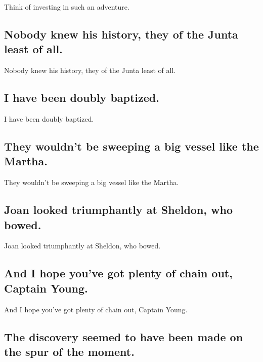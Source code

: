 \documentclass[]{article}
\begin{document}
Think of investing in such an adventure.

\hypertarget{nobody-knew-his-history-they-of-the-junta-least-of-all.}{%
\subsection{Nobody knew his history, they of the Junta least of
all.}\label{nobody-knew-his-history-they-of-the-junta-least-of-all.}}

Nobody knew his history, they of the Junta least of all.

\hypertarget{i-have-been-doubly-baptized.}{%
\subsection{I have been doubly
baptized.}\label{i-have-been-doubly-baptized.}}

I have been doubly baptized.

\hypertarget{they-wouldnt-be-sweeping-a-big-vessel-like-the-martha.}{%
\subsection{They wouldn't be sweeping a big vessel like the
Martha.}\label{they-wouldnt-be-sweeping-a-big-vessel-like-the-martha.}}

They wouldn't be sweeping a big vessel like the Martha.

\hypertarget{joan-looked-triumphantly-at-sheldon-who-bowed.}{%
\subsection{Joan looked triumphantly at Sheldon, who
bowed.}\label{joan-looked-triumphantly-at-sheldon-who-bowed.}}

Joan looked triumphantly at Sheldon, who bowed.

\hypertarget{and-i-hope-youve-got-plenty-of-chain-out-captain-young.}{%
\subsection{And I hope you've got plenty of chain out, Captain
Young.}\label{and-i-hope-youve-got-plenty-of-chain-out-captain-young.}}

And I hope you've got plenty of chain out, Captain Young.

\hypertarget{the-discovery-seemed-to-have-been-made-on-the-spur-of-the-moment.}{%
\subsection{The discovery seemed to have been made on the spur of the
moment.}\label{the-discovery-seemed-to-have-been-made-on-the-spur-of-the-moment.}}
\end{document}
